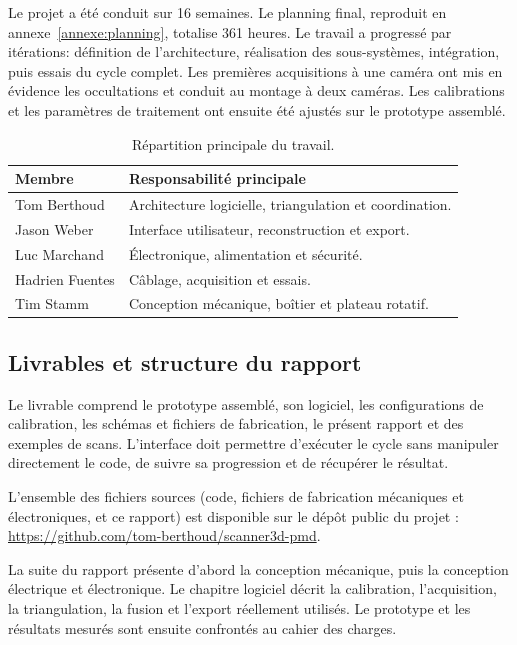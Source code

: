 Le projet a été conduit sur 16 semaines. Le planning final, reproduit en
annexe~\ref{annexe:planning}, totalise 361 heures. Le travail a progressé par
itérations: définition de l'architecture, réalisation des sous-systèmes,
intégration, puis essais du cycle complet. Les premières acquisitions à une
caméra ont mis en évidence les occultations et conduit au montage à deux
caméras. Les calibrations et les paramètres de traitement ont ensuite été
ajustés sur le prototype assemblé.

\begin{table}[H]
  \centering
  \begin{tabular}{@{}p{4.5cm}p{10cm}@{}}
    \toprule
    \textbf{Membre} & \textbf{Responsabilité principale} \\
    \midrule
    Tom Berthoud    & Architecture logicielle, triangulation et coordination. \\
    Jason Weber     & Interface utilisateur, reconstruction et export. \\
    Luc Marchand    & Électronique, alimentation et sécurité. \\
    Hadrien Fuentes & Câblage, acquisition et essais. \\
    Tim Stamm       & Conception mécanique, boîtier et plateau rotatif. \\
    \bottomrule
  \end{tabular}
  \caption{Répartition principale du travail.}
  \label{tab:roles}
\end{table}

\subsection{Livrables et structure du rapport}

Le livrable comprend le prototype assemblé, son logiciel, les configurations
de calibration, les schémas et fichiers de fabrication, le présent rapport et
des exemples de scans. L'interface doit permettre d'exécuter le cycle sans
manipuler directement le code, de suivre sa progression et de récupérer le
résultat.

L'ensemble des fichiers sources (code, fichiers de fabrication mécaniques et
électroniques, et ce rapport) est disponible sur le dépôt public du projet :
\url{https://github.com/tom-berthoud/scanner3d-pmd}.

La suite du rapport présente d'abord la conception mécanique, puis la
conception électrique et électronique. Le chapitre logiciel décrit la
calibration, l'acquisition, la triangulation, la fusion et l'export réellement
utilisés. Le prototype et les résultats mesurés sont ensuite confrontés au
cahier des charges.
